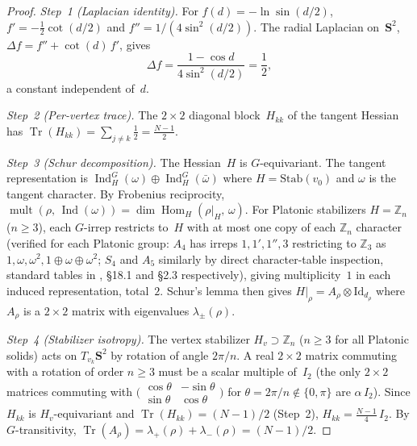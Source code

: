 \begin{proof}
\emph{Step~1 (Laplacian identity).}
For $f(d) = -\ln\sin(d/2)$,
$f' = -\tfrac{1}{2}\cot(d/2)$ and
$f'' = 1/(4\sin^2(d/2))$.
The radial Laplacian on~$\mathbf{S}^2$,
$\Delta f = f'' + \cot(d)\,f'$, gives
\[
  \Delta f = \frac{1 - \cos d}{4\sin^2(d/2)} = \frac{1}{2},
\]
a constant independent of~$d$.

\emph{Step~2 (Per-vertex trace).}
The $2 \times 2$ diagonal block~$H_{kk}$ of the tangent Hessian has
$\operatorname{Tr}(H_{kk}) = \sum_{j \neq k} \frac{1}{2} = \frac{N-1}{2}$.

\emph{Step~3 (Schur decomposition).}
The Hessian~$H$ is $G$-equivariant.  The tangent representation is
$\operatorname{Ind}_H^G(\omega) \oplus \operatorname{Ind}_H^G(\bar\omega)$
where $H = \mathrm{Stab}(v_0)$ and $\omega$ is the tangent character.
By Frobenius reciprocity,
$\operatorname{mult}(\rho,\, \operatorname{Ind}(\omega))
= \dim\operatorname{Hom}_H(\rho|_H,\, \omega)$.
For Platonic stabilizers $H = \mathbb{Z}_n$ ($n \ge 3$), each
$G$-irrep restricts to~$H$ with at most one copy of each
$\mathbb{Z}_n$ character (verified for each Platonic group:
$A_4$ has irreps $1,1',1'',3$ restricting to $\mathbb{Z}_3$
as $1, \omega, \omega^2, 1{\oplus}\omega{\oplus}\omega^2$;
$S_4$ and $A_5$ similarly by direct character-table
inspection, standard tables in \citealt{FultonHarris1991},
\S18.1 and \S2.3 respectively), giving multiplicity~$1$
in each induced representation, total~$2$.
Schur's lemma then gives
$H|_\rho = A_\rho \otimes \mathrm{Id}_{d_\rho}$ where
$A_\rho$ is a $2 \times 2$ matrix with eigenvalues
$\lambda_\pm(\rho)$.

\emph{Step~4 (Stabilizer isotropy).}
The vertex stabilizer $H_v \supset \mathbb{Z}_n$ ($n \ge 3$ for
all Platonic solids) acts on $T_{v_k}\mathbf{S}^2$ by rotation
of angle $2\pi/n$.  A real $2 \times 2$ matrix commuting with
a rotation of order $n \ge 3$ must be a scalar multiple of~$I_2$
(the only $2 \times 2$ matrices commuting with
$\bigl(\begin{smallmatrix}\cos\theta & -\sin\theta \\
\sin\theta & \cos\theta\end{smallmatrix}\bigr)$ for
$\theta = 2\pi/n \notin \{0,\pi\}$ are $\alpha\,I_2$).
Since $H_{kk}$ is $H_v$-equivariant and
$\operatorname{Tr}(H_{kk}) = (N{-}1)/2$ (Step~2),
$H_{kk} = \tfrac{N-1}{4}\,I_2$.
By $G$-transitivity, $\operatorname{Tr}(A_\rho)
= \lambda_+(\rho) + \lambda_-(\rho) = (N{-}1)/2$.
\end{proof}

